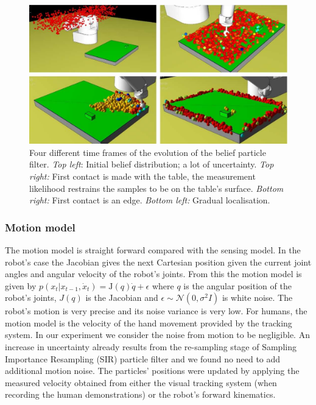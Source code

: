\begin{figure}
  \centering
  \includegraphics[width=\textwidth]{./ch3-Search/Figures/particlefilter.pdf}
  \caption{Four different time frames of the evolution of the belief particle filter. \textit{Top left}: Initial belief distribution; a lot of uncertainty.
  \textit{Top right:} First contact is made with the table, the measurement likelihood restrains the samples to be on the table's surface. \textit{Bottom right:}
  First contact is an edge. \textit{Bottom left:} Gradual localisation.}
  \label{fig:pf_example}
\end{figure}

\subsubsection{Motion model}

The motion model is straight forward compared with the sensing model. In the robot's case the Jacobian gives the next 
Cartesian position given the current joint angles and angular velocity of the robot's joints.
From this the motion model is given by $ p(x_{t}|x_{t-1},\dot{x}_{t}) = \mathrm{J}(q)\dot{q} + \epsilon$ where $q$ is 
the angular position of the robot's joints, $J(q)$ is the Jacobian and $\epsilon \sim \mathcal{N}(0,\sigma^{2}I)$ is white noise. 
The robot's motion is very precise and its noise variance is very low. For humans, the motion model is the velocity of the hand 
movement provided by the tracking system. In our experiment we consider the noise from motion to be negligible. An increase in 
uncertainty already results from the re-sampling stage of Sampling Importance Resampling (SIR) particle filter and we found 
no need to add additional motion noise.
The particles' positions were updated by applying the measured velocity obtained from either the visual tracking system 
(when recording the human demonstrations) or the robot's forward kinematics.

